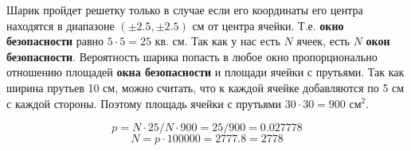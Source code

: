 \solutionSection
Шарик пройдет решетку только в случае если его координаты его центра находятся в диапазоне $(\pm 2.5, \pm 2.5)$ см от центра ячейки. Т.е. \textbf{окно безопасности} равно $5\cdot 5 = 25$ кв. см. Так как у нас есть $N$ ячеек, есть $N$ \textbf{окон безопасности}. Вероятность шарика попасть в любое окно пропорционально отношению площадей \textbf{окна безопасности} и площади ячейки с прутьями. Так как ширина прутьев 10 см, можно считать, что к каждой ячейке добавляются по 5 см с каждой стороны. Поэтому площадь ячейки с прутьями $30\cdot 30 = 900$ см$^2$. 

\[p = N \cdot  25 / N \cdot  900 = 25 / 900 = 0.027778\]
\[N = p \cdot  100000  = 2777.8 = 2778\]


